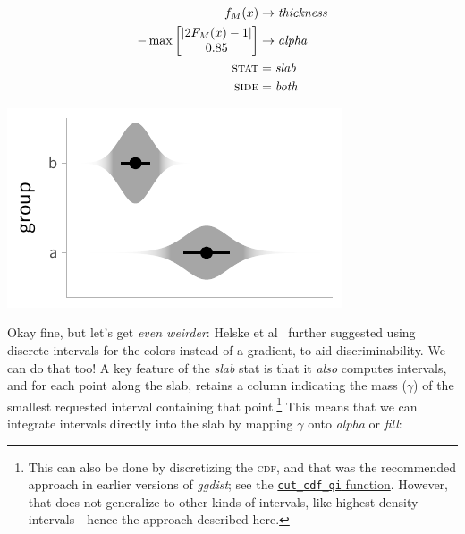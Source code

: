 \documentclass[journal]{vgtc}              %
\begin{document}
 \noindent
\begin{minipage}{.5\columnwidth}

\begin{align*}
f_M(x) &\rightarrow \textit{thickness}\\
-\max \left[ \begin{matrix} \lvert 2 F_M(x) - 1 \rvert \\ 0.85 \end{matrix} \right] &\rightarrow \textit{alpha}\\
\textsc{stat} &= \mathit{slab}\\
\textsc{side} &= \mathit{both}
\end{align*}
\end{minipage}%
  \begin{minipage}{.4\columnwidth}
    \centering
    \includegraphics[width=1.2\columnwidth]{figs/3-slab_violin_gradient.pdf}
  \end{minipage}
\hfill\break

Okay fine, but let's get \textit{even weirder}: Helske et al~\cite{helske2021can} further suggested using discrete intervals for the colors instead of a gradient, to aid discriminability. We can do that too! A key feature of the \textit{slab} stat is that it \textit{also} computes intervals, and for each point along the slab, retains a column indicating the mass ($\gamma$) of the smallest requested interval containing that point.\footnote{This can also be done by discretizing the \textsc{cdf}, and that was the recommended approach in earlier versions of \textit{ggdist}; see the \href{https://mjskay.github.io/ggdist/reference/cut_cdf_qi.html}{\texttt{cut\_cdf\_qi} function}. However, that does not generalize to other kinds of intervals, like highest-density intervals---hence the approach described here.}  This means that we can integrate intervals directly into the slab by mapping $\gamma$ onto \textit{alpha} or \textit{fill}:
\end{document}

